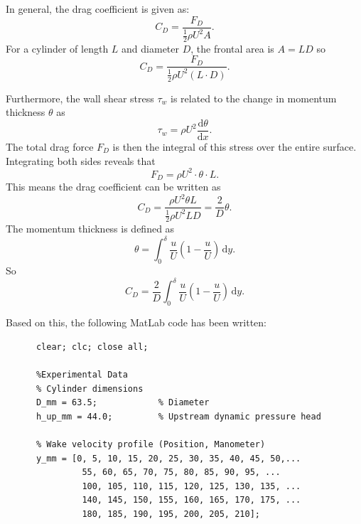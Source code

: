   \begin{derivation}
    In general, the drag coefficient is given as:
    \begin{equation*}
      C_D = \frac{F_D}{\frac{1}{2} \rho U^2 A}
    .\end{equation*}
    For a cylinder of length $L$ and diameter $D$, the frontal area is $A = LD$ so
    \begin{equation*}
      C_D = \frac{F_D}{\frac{1}{2} \rho U^2 \left( L \cdot D \right)}
    .\end{equation*}
    
    Furthermore, the wall shear stress $\tau_w$ is related to the change in momentum thickness $\theta$ as
    \begin{equation*}
      \tau_w = \rho U^2 \frac{\mathrm{d}\theta}{\mathrm{d}x} 
    .\end{equation*}
    The total drag force $F_D$ is then the integral of this stress over the entire surface.
    Integrating both sides reveals that
    \begin{equation*}
      F_D = \rho U^2 \cdot \theta \cdot L
    .\end{equation*}
    This means the drag coefficient can be written as
    \begin{equation*}
      C_D = \frac{\rho U^2 \theta L}{\frac{1}{2} \rho U^2 L D} = \frac{2}{D} \theta
    .\end{equation*}
    The momentum thickness is defined as
    \begin{equation*}
      \theta = \int_{0}^{\delta} \frac{u}{U} \left( 1 - \frac{u}{U} \right) \, \mathrm{d}y
    .\end{equation*}
    So
    \begin{equation*}
      C_D = \frac{2}{D} \int_{0}^{\delta}  \frac{u}{U} \left( 1 - \frac{u}{U} \right) \, \mathrm{d}y 
    .\end{equation*}
    
    
    Based on this, the following MatLab code has been written:
    \begin{verbatim}
      clear; clc; close all;

      %Experimental Data
      % Cylinder dimensions
      D_mm = 63.5;            % Diameter
      h_up_mm = 44.0;         % Upstream dynamic pressure head

      % Wake velocity profile (Position, Manometer)
      y_mm = [0, 5, 10, 15, 20, 25, 30, 35, 40, 45, 50,...
               55, 60, 65, 70, 75, 80, 85, 90, 95, ...
               100, 105, 110, 115, 120, 125, 130, 135, ...
               140, 145, 150, 155, 160, 165, 170, 175, ...
               180, 185, 190, 195, 200, 205, 210];


\end{verbatim}
\end{derivation}
